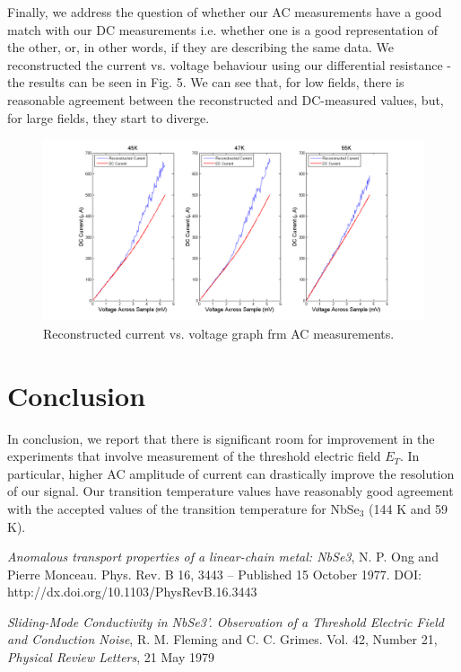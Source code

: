 \documentclass[aps,prl,nofootinbib,twocolumn,superscriptaddress,groupedaddress]{revtex4}  %
\begin{document}
Finally, we address the question of whether our AC measurements have a good match with our DC measurements i.e. whether one is a good representation of the other, or, in other words, if they are describing the same data. We reconstructed the current vs. voltage behaviour using our differential resistance - the results can be seen in Fig. 5. We can see that, for low fields, there is reasonable agreement between the reconstructed and DC-measured values, but, for large fields, they start to diverge.  

\onecolumngrid

\begin{center}
\begin{figure}[t]
\centering
\includegraphics[scale=0.5]{../Analysis/../Analysis/ReconstructedCurrent.png} 
\caption{Reconstructed current vs. voltage graph frm AC measurements.}
\end{figure}
\end{center}

\twocolumngrid

\section{Conclusion}

In conclusion, we report that there is significant room for improvement in the experiments that involve measurement of the threshold electric field $E_{T}$. In particular, higher AC amplitude of current can drastically improve the resolution of our signal. Our transition temperature values have reasonably good agreement with the accepted values\cite{ong} of the transition temperature for NbSe$_{3}$ (144 K and 59 K).
\begin{thebibliography}{2}

    \textit{Anomalous transport properties of a linear-chain metal: NbSe3}, N. P. Ong and Pierre Monceau. Phys. Rev. B 16, 3443 – Published 15 October 1977. DOI: http://dx.doi.org/10.1103/PhysRevB.16.3443
    
  \textit{Sliding-Mode Conductivity in NbSe3'. Observation of a Threshold Electric Field and Conduction Noise}, R. M. Fleming and C. C. Grimes. Vol. 42, Number 21, \textit{Physical Review Letters}, 21 May 1979 

\end{thebibliography}
\end{document}
